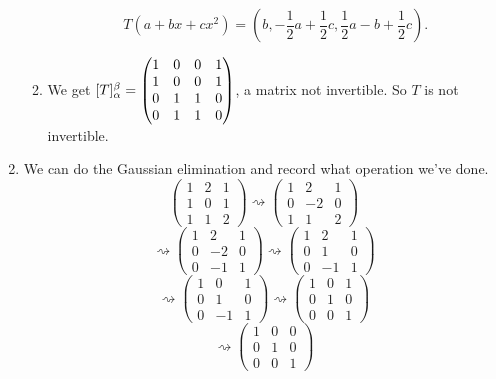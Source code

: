 \begin{enumerate}
\begin{enumerate}
\[T(a+bx+cx^2)=(b,-\frac{1}{2}a+\frac{1}{2}c,\frac{1}{2}a-b+\frac{1}{2}c).\]
\item We get $[T]_{\alpha}^{\beta}=\begin{pmatrix}1 & 0 & 0 & 1\cr 1 & 0 & 0 & 1\cr 0 & 1 & 1 & 0\cr 0 & 1 & 1 & 0\end{pmatrix}$, a matrix not invertible. So $T$ is not invertible.
\end{enumerate}
\item We can do the Gaussian elimination and record what operation we've done.
\[\left(\begin{array}{ccc}1&2&1\\1&0&1\\1&1&2\end{array}\right)\rightsquigarrow \left(\begin{array}{ccc}1&2&1\\0&-2&0\\1&1&2\end{array}\right)\]
\[\rightsquigarrow \left(\begin{array}{ccc}1&2&1\\0&-2&0\\0&-1&1\end{array}\right)\rightsquigarrow \left(\begin{array}{ccc}1&2&1\\0&1&0\\0&-1&1\end{array}\right)\]
\[\rightsquigarrow \left(\begin{array}{ccc}1&0&1\\0&1&0\\0&-1&1\end{array}\right)\rightsquigarrow \left(\begin{array}{ccc}1&0&1\\0&1&0\\0&0&1\end{array}\right)\]
\[\rightsquigarrow \left(\begin{array}{ccc}1&0&0\\0&1&0\\0&0&1\end{array}\right)\]

\end{enumerate}
